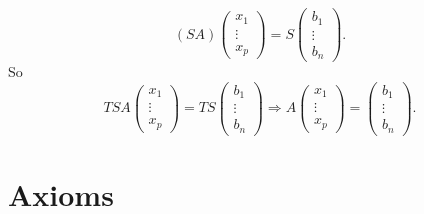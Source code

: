 \documentclass{book}
\numberwithin{equation}{section}
\begin{document}
\begin{proofenv}
     \begin{equation*}
        (SA)\begin{pmatrix}
        x_1\\
        \vdots\\
        x_p
        \end{pmatrix}=S\begin{pmatrix}
        b_1\\
        \vdots\\
        b_n
        \end{pmatrix}.
    \end{equation*}
    So 
     \begin{equation*}
        TSA\begin{pmatrix}
        x_1\\
        \vdots\\
        x_p
        \end{pmatrix}=TS\begin{pmatrix}
        b_1\\
        \vdots\\
        b_n
        \end{pmatrix}
        \Rightarrow
        A\begin{pmatrix}
        x_1\\        
        \vdots\\
        x_p
        \end{pmatrix}=\begin{pmatrix}
        b_1\\
        \vdots\\
        b_n
        \end{pmatrix}.
    \end{equation*}
\end{proofenv}











\appendix












\chapter{Axioms}
\end{document}
